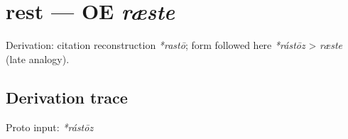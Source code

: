 \documentclass[
  british,
  a4paper,
  openany]{book}
\providecommand{\texorpdfstring}[2]{#1}
\begin{document}
\section{\texorpdfstring{rest --- OE
\emph{ræste}}{rest --- OE ræste}}\label{rest-oe-ruxe6ste}


Derivation: citation reconstruction \emph{*rastō}; form followed here
\emph{*rástōz} \textgreater{} \emph{ræste} (late analogy).

\subsection{Derivation trace}\label{derivation-trace-121}

Proto input: \emph{*rástōz}

\begingroup
\setlength{\fboxsep}{6pt}
\end{document}
